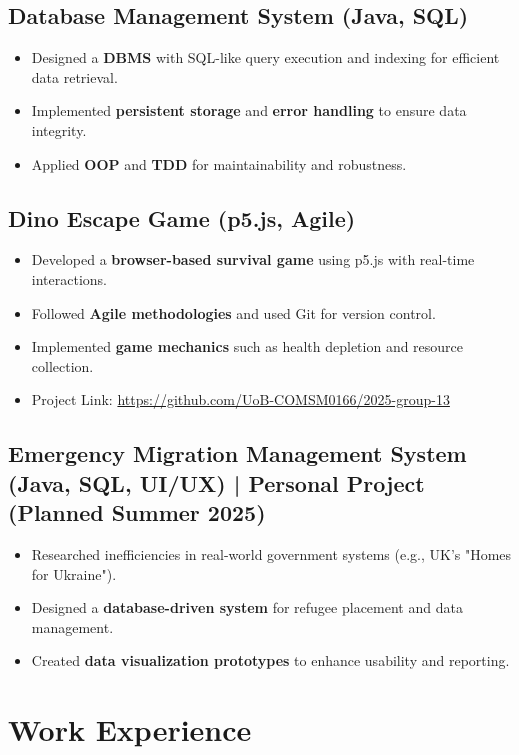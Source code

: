 \documentclass[10pt,a4paper]{article} %
\begin{document}
\subsection*{Database Management System (Java, SQL)}
\begin{itemize}
    \item Designed a \textbf{DBMS} with SQL-like query execution and indexing for efficient data retrieval.
    \item Implemented \textbf{persistent storage} and \textbf{error handling} to ensure data integrity.
    \item Applied \textbf{OOP} and \textbf{TDD} for maintainability and robustness.
\end{itemize}

\subsection*{Dino Escape Game (p5.js, Agile)}
\begin{itemize}
    \item Developed a \textbf{browser-based survival game} using p5.js with real-time interactions.
    \item Followed \textbf{Agile methodologies} and used Git for version control.
    \item Implemented \textbf{game mechanics} such as health depletion and resource collection.
    \item Project Link: \href{https://github.com/UoB-COMSM0166/2025-group-13}{https://github.com/UoB-COMSM0166/2025-group-13}
\end{itemize}

\subsection*{Emergency Migration Management System (Java, SQL, UI/UX) | Personal Project (Planned Summer 2025)}
\begin{itemize}
    \item Researched inefficiencies in real-world government systems (e.g., UK's "Homes for Ukraine").
    \item Designed a \textbf{database-driven system} for refugee placement and data management.
    \item Created \textbf{data visualization prototypes} to enhance usability and reporting.
\end{itemize}

\section*{Work Experience}
\end{document}
